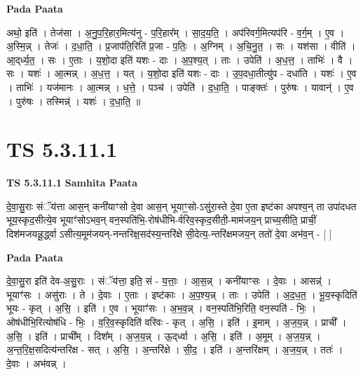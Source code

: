 \documentclass[17pt]{extarticle}
\begin{document}
\textbf{Pada Paata} \newline

अथो॒ इति॑ । तेज॑सा । अ॒नु॒प॒रि॒हार॒मित्य॑नु - प॒रि॒हार᳚म् । सा॒द॒य॒ति॒ । अप॑रिवर्ग॒मित्यप॑रि - व॒र्ग॒म् । ए॒व । अ॒स्मि॒न्न् । तेजः॑ । द॒धा॒ति॒ । प्र॒जाप॑ति॒रिति॑ प्र॒जा - प॒तिः॒ । अ॒ग्निम् । अ॒चि॒नु॒त॒ । सः । यश॑सा । वीति॑ । आ॒द्‌र्ध्य॒त॒ । सः । ए॒ताः । य॒शो॒दा इति॑ यशः - दाः । अ॒प॒श्य॒त् । ताः । उपेति॑ । अ॒ध॒त्त॒ । ताभिः॑ । वै । सः । यशः॑ । आ॒त्मन्न् । अ॒ध॒त्त॒ । यत् । य॒शो॒दा इति॑ यशः - दाः । उ॒प॒दधा॒तीत्यु॑प - दधा॑ति । यशः॑ । ए॒व । ताभिः॑ । यज॑मानः । आ॒त्मन्न् । ध॒त्ते॒ । पञ्च॑ । उपेति॑ । द॒धा॒ति॒ । पाङ्क्तः॑ । पुरु॑षः । यावान्॑ । ए॒व । पुरु॑षः । तस्मिन्न्॑ । यशः॑ । द॒धा॒ति॒ ॥  \newline





\section{ TS 5.3.11.1 }

\textbf{TS 5.3.11.1 } \newline
\textbf{Samhita Paata} \newline

दे॒वा॒सु॒राः संॅय॑त्ता आस॒न् कनी॑याꣳसो दे॒वा आस॒न् भूयाꣳ॒॒सो-ऽसु॑रा॒स्ते दे॒वा ए॒ता इष्ट॑का अपश्य॒न् ता उपा॑दधत भूय॒स्कृद॒सीत्ये॒व भूयाꣳ॑सोऽभव॒न् वन॒स्पति॑भि॒-रोष॑धीभि-र्वरिव॒स्कृद॒सीती॒-माम॑जय॒न् प्राच्य॒सीति॒ प्राचीं॒ दिश॑मजयन्नू॒र्द्ध्वा ऽसीत्य॒मूम॑जयन्-नन्तरिक्ष॒सद॑स्य॒न्तरि॑क्षे सी॒देत्य॒-न्तरि॑क्षमजय॒न् ततो॑ दे॒वा अभ॑व॒न् - [  ] \newline

\textbf{Pada Paata} \newline

दे॒वा॒सु॒रा इति॑ देव-अ॒सु॒राः । संॅय॑त्ता॒ इति॒ सं - य॒त्ताः॒ । आ॒स॒न्न् । कनी॑याꣳसः । दे॒वाः । आसन्न्॑ । भूयाꣳ॑सः । असु॑राः । ते । दे॒वाः । ए॒ताः । इष्ट॑काः । अ॒प॒श्य॒न्न् । ताः । उपेति॑ । अ॒द॒ध॒त॒ । भू॒य॒स्कृदिति॑ भूयः - कृत् । अ॒सि॒ । इति॑ । ए॒व । भूयाꣳ॑सः । अ॒भ॒व॒न्न् । वन॒स्पति॑भि॒रिति॒ वन॒स्पति॑ - भिः॒ । ओष॑धीभि॒रित्योष॑धि - भिः॒ । व॒रि॒व॒स्कृदिति॑ वरिवः - कृत् । अ॒सि॒ । इति॑ । इ॒माम् । अ॒ज॒य॒न्न् । प्राची᳚ । अ॒सि॒ । इति॑ । प्राची᳚म् । दिश᳚म् । अ॒ज॒य॒न्न् । ऊ॒द्‌र्ध्वा । अ॒सि॒ । इति॑ । अ॒मूम् । अ॒ज॒य॒न्न् । अ॒न्त॒रि॒क्ष॒सदित्य॑न्तरिक्ष - सत् । अ॒सि॒ । अ॒न्तरि॑क्षे । सी॒द॒ । इति॑ । अ॒न्तरि॑क्षम् । अ॒ज॒य॒न्न् । ततः॑ । दे॒वाः । अभ॑वन्न् ।  \newline
\end{document}
